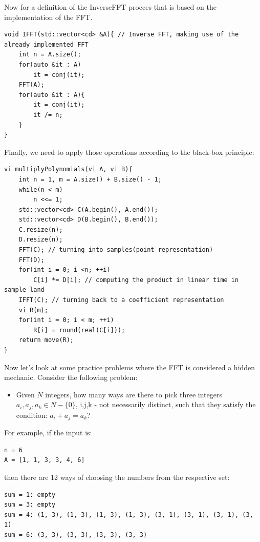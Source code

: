 \documentclass[letterpaper]{article}
\begin{document}
Now for a definition of the InverseFFT procces that is based on the implementation of the FFT.

\begin{lstlisting}
void IFFT(std::vector<cd> &A){ // Inverse FFT, making use of the already implemented FFT
    int n = A.size();
    for(auto &it : A)
        it = conj(it);
    FFT(A);
    for(auto &it : A){
        it = conj(it);
        it /= n;
    }
}

\end{lstlisting}

Finally, we need to apply those operations according to the black-box principle:

\begin{lstlisting}
vi multiplyPolynomials(vi A, vi B){
    int n = 1, m = A.size() + B.size() - 1;
    while(n < m)
        n <<= 1;
    std::vector<cd> C(A.begin(), A.end());
    std::vector<cd> D(B.begin(), B.end());
    C.resize(n);
    D.resize(n);
    FFT(C); // turning into samples(point representation)
    FFT(D);
    for(int i = 0; i <n; ++i)
        C[i] *= D[i]; // computing the product in linear time in sample land
    IFFT(C); // turning back to a coefficient representation
    vi R(m);
    for(int i = 0; i < m; ++i)
        R[i] = round(real(C[i]));
    return move(R);
}
\end{lstlisting}

Now let's look at some practice problems where the FFT is considered a hidden mechanic. Consider the following problem:

\begin{itemize}
    \item Given $N$ integers, how many ways are there to pick three integers $a_i, a_j, a_k \in {N - \{ 0 \}}$, i,j,k - not necessarily distinct, such that they satisfy the condition: $a_i + a_j = a_k$?
\end{itemize}

For example, if the input is:

\begin{lstlisting}
n = 6
A = [1, 1, 3, 3, 4, 6]
\end{lstlisting}

then there are 12 ways of choosing the numbers from the respective set:

\begin{lstlisting}
sum = 1: empty
sum = 3: empty
sum = 4: (1, 3), (1, 3), (1, 3), (1, 3), (3, 1), (3, 1), (3, 1), (3, 1)
sum = 6: (3, 3), (3, 3), (3, 3), (3, 3)
\end{lstlisting}
\end{document}
